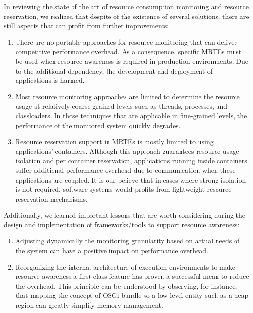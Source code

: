 In reviewing the state of the art of resource consumption monitoring and resource reservation, we realized that despite of the existence of several solutions, there are still aspects that can profit from further improvements:
\begin{enumerate}
\item There are no portable approaches for resource monitoring that can deliver competitive performance overhead.
As a consequence, specific MRTEs must be used when resource awareness is required in production environments.
Due to the additional dependency, the development and deployment of applications is harmed.

\item Most resource monitoring approaches are limited to determine the resource usage at relatively coarse-grained levels  such as threads, processes, and classloaders.
In those techniques that are applicable in fine-grained levels, the performance of the monitored system quickly degrades. 

\item Resource reservation support in MRTEs is mostly limited to using applications' containers.
Although this approach guarantees resource usage isolation and per container reservation, applications running inside containers suffer additional performance overhead due to communication when these applications are coupled.
It is our believe that in cases where strong isolation is not required, software systems would profits from lightweight resource reservation mechanisms. 
\end{enumerate}

Additionally, we learned important lessons that are worth considering during the design and implementation of frameworks/tools to support resource awareness:
\begin{enumerate}
\item Adjusting dynamically the monitoring granularity based on actual needs of the system can have
a positive impact on performance overhead.

\item Reorganizing the internal architecture of execution environments to make resource awareness a first-class feature has proven a successful mean to reduce the overhead.
This principle can be understood by observing, for instance, that mapping the concept of OSGi bundle to a low-level entity such as a heap region can greatly simplify memory management. 
\end{enumerate}


